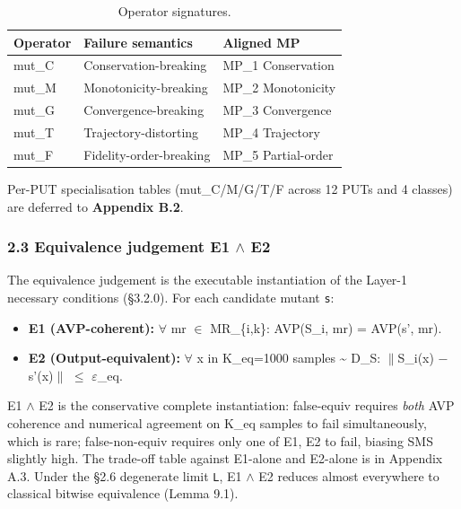 \documentclass[review,12pt,authoryear]{elsarticle}
\providecommand{\tightlist}{\setlength{\itemsep}{0pt}\setlength{\parskip}{0pt}}
\begin{document}
{\def\LTcaptype{table} %
\begin{longtable}[]{@{}lll@{}}
\caption{Operator signatures.}\label{tab:p2-01}\\
\toprule\noalign{}
Operator & Failure semantics & Aligned MP \\
\midrule\noalign{}
\endhead
\bottomrule\noalign{}
\endlastfoot
mut\_C & Conservation-breaking & MP\_1 Conservation \\
mut\_M & Monotonicity-breaking & MP\_2 Monotonicity \\
mut\_G & Convergence-breaking & MP\_3 Convergence \\
mut\_T & Trajectory-distorting & MP\_4 Trajectory \\
mut\_F & Fidelity-order-breaking & MP\_5 Partial-order \\
\end{longtable}
}

Per-PUT specialisation tables (mut\_C/M/G/T/F across 12 PUTs and 4
classes) are deferred to \textbf{Appendix B.2}.

\subsubsection{2.3 Equivalence judgement E1 $\wedge$ E2}\label{equivalence-judgement-e1-e2-layer-2}

The equivalence judgement is the executable instantiation of the Layer-1
necessary conditions (§3.2.0). For each candidate mutant
\texttt{s\textquotesingle{}}:

\begin{itemize}
\tightlist
\item
  \textbf{E1 (AVP-coherent):} $\forall$ mr $\in$ MR\_\{i,k\}: AVP(S\_i, mr) =
  AVP(s', mr).
\item
  \textbf{E2 (Output-equivalent):} $\forall$ x in K\_eq=1000 samples
  \textasciitilde{} D\_S: $\|$S\_i(x) − s'(x)$\|$ $\leq$ $\varepsilon$\_eq.
\end{itemize}

E1 $\wedge$ E2 is the conservative complete instantiation: false-equiv requires
\emph{both} AVP coherence and numerical agreement on K\_eq samples to
fail simultaneously, which is rare; false-non-equiv requires only one of
E1, E2 to fail, biasing SMS slightly high. The trade-off table against
E1-alone and E2-alone is in Appendix A.3. Under the §2.6 degenerate
limit \texttt{L}, E1 $\wedge$ E2 reduces almost everywhere to classical bitwise
equivalence (Lemma 9.1).
\end{document}
